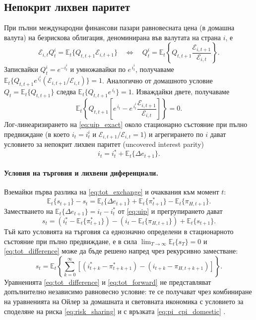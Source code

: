 \subsection{Непокрит лихвен паритет}

При пълни международни финансови пазари равновесната цена (в домашна валута) на безрискова облигация, деноминирана във валутата на страна $i$, е
\[
\mathcal{E}_{i,t} Q^i_t = \mathbb{E}_t\{ Q_{t,t+1} \mathcal{E}_{i,t+1} \}
\quad \Longleftrightarrow \quad
Q^i_t = \mathbb{E}_t\left\{ Q_{t,t+1} \frac{\mathcal{E}_{i,t+1}}{\mathcal{E}_{i,t}} \right\}.
\]
Записвайки $Q^i_t = e^{-i^i_t}$ и умножавайки по $e^{\,i^i_t}$, получаваме $\mathbb{E}_t\{Q_{t,t+1} e^{\,i^i_t}(\mathcal{E}_{i,t+1}/\mathcal{E}_{i,t})\} = 1$. Аналогично от домашното условие $Q_t = \mathbb{E}_t\{Q_{t,t+1}\}$ следва $\mathbb{E}_t\{Q_{t,t+1}e^{\,i_t}\} = 1$. Изваждайки двете, получаваме
\begin{equation}
\mathbb{E}_t \left\{ Q_{t,t+1} \left[ e^{\,i_t} - e^{\,i^i_t} \frac{\mathcal{E}_{i,t+1}}{\mathcal{E}_{i,t}} \right] \right\} = 0.
\label{eq:uip_exact}
\end{equation}
Лог-линеаризирането на \eqref{eq:uip_exact} около стационарно състояние при пълно предвиждане (в което $i_t = i^i_t$ и $\mathcal{E}_{i,t+1}/\mathcal{E}_{i,t} = 1$) и агрегирането по $i$ дават условието за непокрит лихвен паритет (uncovered interest parity)
\begin{equation}
i_t = i^*_t + \mathbb{E}_t\{ \Delta e_{t+1} \}.
\label{eq:uip}
\end{equation}

\paragraph{Условия на търговия и лихвени диференциали.}
Вземайки първа разлика на \eqref{eq:tot_exchange} и очаквания към момент $t$:
\[
\mathbb{E}_t\{ s_{t+1} \} - s_t
= \mathbb{E}_t\{ \Delta e_{t+1} \} + \mathbb{E}_t\{ \pi^*_{t+1} \} - \mathbb{E}_t\{ \pi_{H,t+1} \}.
\]
Заместването на $\mathbb{E}_t\{\Delta e_{t+1}\} = i_t - i^*_t$ от \eqref{eq:uip} и прегрупирането дават
\begin{equation}
s_t = \left( i^*_t - \mathbb{E}_t\{\pi^*_{t+1}\} \right) - \left( i_t - \mathbb{E}_t\{\pi_{H,t+1}\} \right) + \mathbb{E}_t\{ s_{t+1} \}.
\label{eq:tot_difference}
\end{equation}
Тъй като условията на търговия са еднозначно определени в стационарното състояние при пълно предвиждане, е в сила $\lim_{T \to \infty} \mathbb{E}_t\{ s_T \} = 0$ и \eqref{eq:tot_difference} може да бъде решено напред чрез рекурсивно заместване:
\begin{equation}
s_t = \mathbb{E}_t \left\{ \sum_{k=0}^{\infty} \left[ (i^*_{t+k} - \pi^*_{t+k+1}) - (i_{t+k} - \pi_{H,t+k+1}) \right] \right\}.
\label{eq:tot_forward}
\end{equation}
Уравненията \eqref{eq:tot_difference} и \eqref{eq:tot_forward} не представляват допълнително независимо равновесно условие: те се получават чрез комбиниране на уравненията на Ойлер за домашната и световната икономика с условието за споделяне на риска \eqref{eq:risk_sharing} и с връзката \eqref{eq:pi_cpi_domestic} \parencite[с.~158]{Gali2008}.

